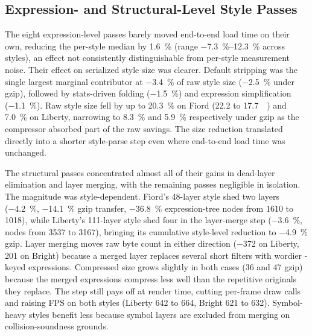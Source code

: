 \subsection{Expression- and Structural-Level Style Passes}\label{sec:results:style}
The eight expression-level passes barely moved end-to-end load time on their own, reducing the per-style median by \qty{1.6}{\percent} (range \qtyrange{-7.3}{+12.3}{\percent} across styles), an effect not consistently distinguishable from per-style measurement noise.
Their effect on serialized style size was clearer.
Default stripping was the single largest marginal contributor at \qty{-3.4}{\percent} of raw style size (\qty{-2.5}{\percent} under gzip), followed by stats-driven folding (\qty{-1.5}{\percent}) and expression simplification (\qty{-1.1}{\percent}).
Raw style size fell by up to \qty{20.3}{\percent} on Fiord (\num{22.2} to \qty{17.7}{\kilo\byte}) and \qty{7.0}{\percent} on Liberty, narrowing to \qty{8.3}{\percent} and \qty{5.9}{\percent} respectively under gzip as the compressor absorbed part of the raw savings.
The size reduction translated directly into a shorter style-parse step even where end-to-end load time was unchanged.

The structural passes concentrated almost all of their gains in dead-layer elimination and layer merging, with the remaining passes negligible in isolation.
The magnitude was style-dependent.
Fiord's 48-layer style shed two layers (\qty{-4.2}{\percent}, \qty{-14.1}{\percent} gzip transfer, \qty{-36.8}{\percent} expression-tree nodes from \num{1610} to \num{1018}), while Liberty's 111-layer style shed four in the layer-merge step (\qty{-3.6}{\percent}, nodes from \num{3537} to \num{3167}), bringing its cumulative style-level reduction to \qty{-4.9}{\percent} gzip.
Layer merging moves raw byte count in either direction (\qty{-372}{\byte} on Liberty, \qty[print-implicit-plus = true]{+201}{\byte} on Bright) because a merged layer replaces several short filters with wordier -keyed expressions.
Compressed size grows slightly in both cases (\qty[print-implicit-plus = true]{+36}{\byte} and \qty[print-implicit-plus = true]{+47}{\byte} gzip) because the merged expressions compress less well than the repetitive originals they replace.
The step still pays off at render time, cutting per-frame draw calls and raising FPS on both styles (Liberty \num{642} to \num{664}, Bright \num{621} to \num{632}).
Symbol-heavy styles benefit less because symbol layers are excluded from merging on collision-soundness grounds.

